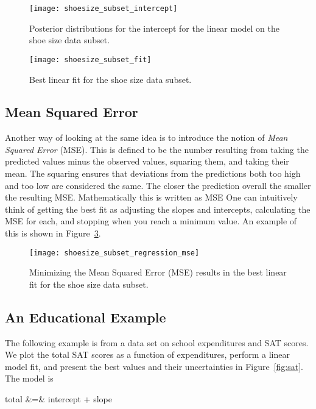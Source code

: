 \begin{figure}
\texttt{[image: shoesize\_subset\_intercept]}
\caption{Posterior distributions for the intercept for the linear model on the shoe size data subset.}\label{fig:shoesize_dist_intercept}
\end{figure}

\begin{figure}
\texttt{[image: shoesize\_subset\_fit]}
\caption{Best linear fit for the shoe size data subset.}\label{fig:shoesize_fit}
\end{figure}


\subsection{Mean Squared Error}

Another way of looking at the same idea is to introduce the notion of \emph{Mean Squared Error} (MSE).  This is defined to be the number resulting from taking the predicted values minus the observed values, squaring them, and taking their mean.  The squaring ensures that deviations from the predictions both too high and too low are considered the same.  The closer the prediction overall the smaller the resulting MSE.  Mathematically this is written as
\beqn
{\rm MSE} \equiv {}
\eeqn
One can intuitively think of getting the best fit as adjusting the slopes and intercepts, calculating the MSE for each, and stopping when you reach a minimum value.  An example of this is shown in Figure~\ref{fig:shoesize_mse}.

\begin{figure}
\texttt{[image: shoesize\_subset\_regression\_mse]}
\caption{Minimizing the Mean Squared Error (MSE) results in the best linear fit for the shoe size data subset.}\label{fig:shoesize_mse}
\end{figure}


\subsection{An Educational Example}

The following example is from a data set on school expenditures and SAT scores.\cite{guber1999getting}  We plot the total SAT scores as a function of expenditures, perform a linear model fit, and present the best values and their uncertainties in Figure~\ref{fig:sat}.  The model is

\beqn
{\rm total} &=& {\rm intercept} + {\rm slope}
\eeqn

